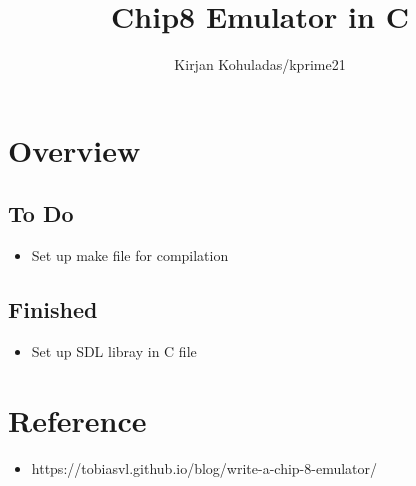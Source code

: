 \documentclass{article}
\title{\vspace{-7em} Chip8 Emulator in C}
\author{Kirjan Kohuladas/kprime21}
\date{}
\begin{document}
\maketitle


\section*{Overview}
\subsection*{To Do}
\begin{itemize}
	
	\item Set up make file for compilation
	
	
\end{itemize}

\subsection*{Finished}
\begin{itemize}
	\item Set up SDL libray in C file
\end{itemize}


\section*{Reference}
\begin{itemize}
	\item https://tobiasvl.github.io/blog/write-a-chip-8-emulator/
\end{itemize}
\end{document}
